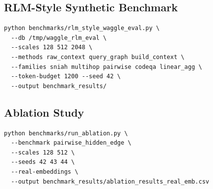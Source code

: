 \documentclass[conference]{IEEEtran}
\begin{document}
\subsection{RLM-Style Synthetic Benchmark}

\begin{verbatim}
python benchmarks/rlm_style_waggle_eval.py \
  --db /tmp/waggle_rlm_eval \
  --scales 128 512 2048 \
  --methods raw_context query_graph build_context \
  --families sniah multihop pairwise codeqa linear_agg \
  --token-budget 1200 --seed 42 \
  --output benchmark_results/
\end{verbatim}

\subsection{Ablation Study}

\begin{verbatim}
python benchmarks/run_ablation.py \
  --benchmark pairwise_hidden_edge \
  --scales 128 512 \
  --seeds 42 43 44 \
  --real-embeddings \
  --output benchmark_results/ablation_results_real_emb.csv
\end{verbatim}
\end{document}
